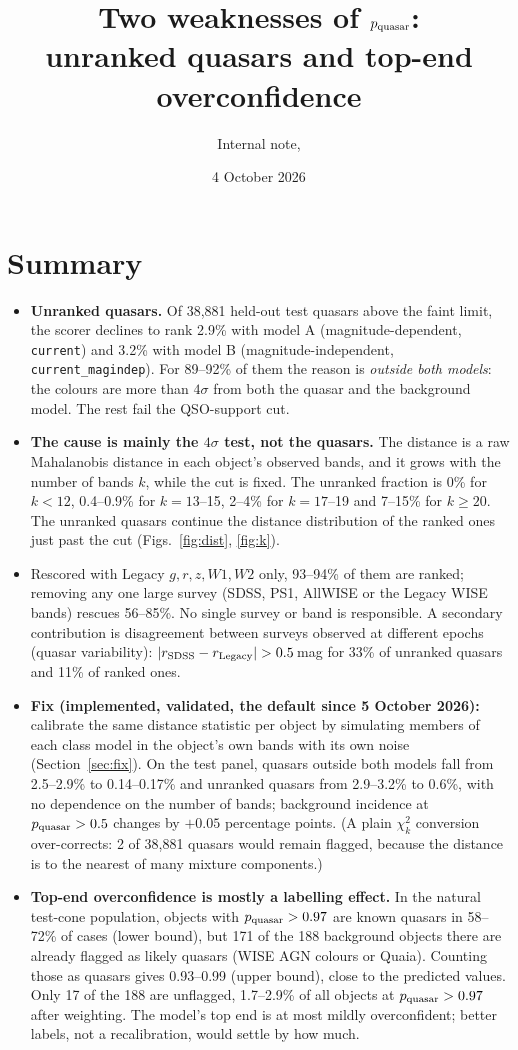\documentclass[11pt,a4paper]{article}
\title{Two weaknesses of $\pq$:\\ unranked quasars and top-end overconfidence}
\author{Internal note, \code{qso\_pcolor}}
\date{4 October 2026}
\newcommand{\code}[1]{\texttt{#1}}
\newcommand{\pq}{p_{\rm quasar}}
\begin{document}
\maketitle

\section*{Summary}
\begin{itemize}
\item \textbf{Unranked quasars.} Of 38,881 held-out test quasars above the faint limit, the scorer declines to
  rank 2.9\% with model A (magnitude-dependent, \code{current}) and 3.2\% with model B (magnitude-independent,
  \code{current\_magindep}). For 89--92\% of them the reason is \emph{outside both models}: the colours are more
  than $4\sigma$ from both the quasar and the background model. The rest fail the QSO-support cut.
\item \textbf{The cause is mainly the $4\sigma$ test, not the quasars.} The distance is a raw Mahalanobis distance
  in each object's observed bands, and it grows with the number of bands $k$, while the cut is fixed. The
  unranked fraction is 0\% for $k<12$, 0.4--0.9\% for $k=13$--15, 2--4\% for $k=17$--19 and 7--15\% for $k\ge20$.
  The unranked quasars continue the distance distribution of the ranked ones just past the cut
  (Figs.~\ref{fig:dist}, \ref{fig:k}).
\item Rescored with Legacy $g,r,z,W1,W2$ only, 93--94\% of them are ranked; removing any one large survey (SDSS,
  PS1, AllWISE or the Legacy WISE bands) rescues 56--85\%. No single survey or band is responsible.
  A secondary contribution is disagreement between surveys observed at different epochs (quasar variability):
  $|r_{\rm SDSS}-r_{\rm Legacy}|>0.5$\,mag for 33\% of unranked quasars and 11\% of ranked ones.
\item \textbf{Fix (implemented, validated, the default since 5 October 2026):} calibrate the same distance statistic per object
  by simulating members of each class model in the object's own bands with its own noise
  (Section~\ref{sec:fix}). On the test panel, quasars outside both models fall from 2.5--2.9\% to 0.14--0.17\% and
  unranked quasars from 2.9--3.2\% to 0.6\%, with no dependence on the number of bands; background incidence at
  $\pq>0.5$ changes by $+0.05$ percentage points. (A plain $\chi^2_k$ conversion over-corrects: 2 of 38,881 quasars
  would remain flagged, because the distance is to the nearest of many mixture components.)
\item \textbf{Top-end overconfidence is mostly a labelling effect.} In the natural test-cone population, objects
  with $\pq>0.97$ are known quasars in 58--72\% of cases (lower bound), but 171 of the 188 background objects
  there are already flagged as likely quasars (WISE AGN colours or Quaia). Counting those as quasars gives
  0.93--0.99 (upper bound), close to the predicted values. Only 17 of the 188 are unflagged, 1.7--2.9\% of
  all objects at $\pq>0.97$ after weighting. The model's top end is at most mildly overconfident; better
  labels, not a recalibration, would settle by how much.
\end{itemize}
\end{document}
